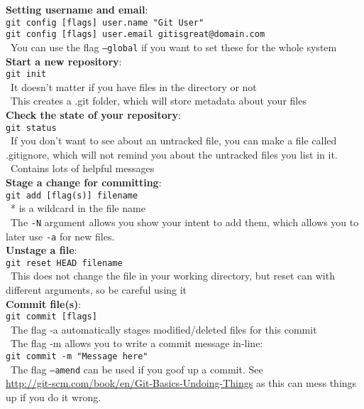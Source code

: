 \documentclass[12pt]{article}
\begin{document}
{\setlength{\parindent}{0cm}
{\bf Setting username and email}:\\
\texttt{git config [flags] user.name "Git User"}\\
\texttt{git config [flags] user.email gitisgreat@domain.com}\\
\textbullet\, You can use the flag \texttt{--global} if you want to set these for the whole system\\

{\bf Start a new repository}:\\
\texttt{git init}\\
\textbullet\, It doesn't matter if you have files in the directory or not\\
\textbullet\, This creates a .git folder, which will store metadata about your files\\

{\bf Check the state of your repository}:\\
\texttt{git status}\\
\textbullet\, If you don't want to see about an untracked file, you can make a file called .gitignore, which will not remind you about the untracked files you list in it.\\
\textbullet\, Contains lots of helpful messages\\

{\bf Stage a change for committing}:\\
\texttt{git add [flag(s)] filename}\\
\textbullet\, * is a wildcard in the file name\\
\textbullet\, The \texttt{-N} argument allows you show your intent to add them, which allows you to later use \texttt{-a} for new files.\\

{\bf Unstage a file}:\\
\texttt{git reset HEAD filename}\\
\textbullet\, This does not change the file in your working directory, but reset can with different arguments, so be careful using it\\

{\bf Commit file(s)}:\\
\texttt{git commit [flags]}\\
\textbullet\, The flag -a automatically stages modified/deleted files for this commit\\
\textbullet\, The flag -m allows you to write a commit message in-line:\\
 \hspace{5mm}\texttt{git commit -m "Message here"}\\ %
\textbullet\, The flag \texttt{--amend} can be used if you goof up a commit. See\\ \url{http://git-scm.com/book/en/Git-Basics-Undoing-Things} as this can mess things up if you do it wrong.\\

}
\end{document}

